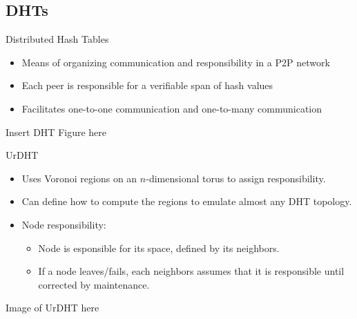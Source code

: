 \documentclass[11pt]{beamer}
\begin{document}
\subsection{DHTs}
\begin{frame}{Distributed Hash Tables}

	\begin{itemize}
		\item  Means of organizing communication and responsibility in a P2P network
		\item  Each peer is responsible for a verifiable span of hash values
		\item  Facilitates one-to-one communication and one-to-many communication
	\end{itemize}

	Insert DHT Figure here

\end{frame}
%
%	

\begin{frame}{UrDHT}
	\begin{itemize}
		\item Uses Voronoi regions on an $n$-dimensional torus to assign responsibility.
		\item Can define how to compute the regions to emulate almost any DHT topology.
		\item Node responsibility:
		\begin{itemize}
			\item Node is  esponsible for its space, defined by its neighbors.
			\item If a node leaves/fails, each neighbors assumes that it is responsible until corrected by maintenance. 
		\end{itemize}
	\end{itemize}
	
	Image of UrDHT here


\end{frame}
\end{document}
